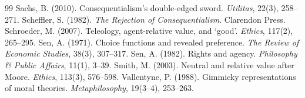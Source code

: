 \documentclass{situationist-preprint}
\begin{document}
\begin{thebibliography}{99}
 Sachs, B. (2010). Consequentialism's double-edged sword. \emph{Utilitas}, 22(3), 258--271.
 Scheffler, S. (1982). \emph{The Rejection of Consequentialism}. Clarendon Press.
 Schroeder, M. (2007). Teleology, agent-relative value, and `good'. \emph{Ethics}, 117(2), 265--295.
 Sen, A. (1971). Choice functions and revealed preference. \emph{The Review of Economic Studies}, 38(3), 307--317.
 Sen, A. (1982). Rights and agency. \emph{Philosophy \& Public Affairs}, 11(1), 3--39.
 Smith, M. (2003). Neutral and relative value after Moore. \emph{Ethics}, 113(3), 576--598.
 Vallentyne, P. (1988). Gimmicky representations of moral theories. \emph{Metaphilosophy}, 19(3--4), 253--263.
\end{thebibliography}
\end{document}
